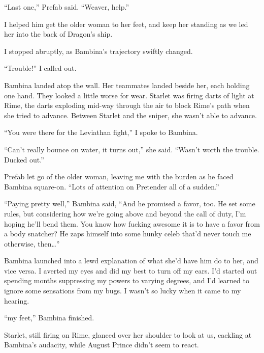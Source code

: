 ``Last one,'' Prefab said.  ``Weaver, help.''



I helped him get the older woman to her feet, and keep her standing as we led her into the back of Dragon's ship.



I stopped abruptly, as Bambina's trajectory swiftly changed.



``Trouble!'' I called out.



Bambina landed atop the wall.  Her teammates landed beside her, each holding one hand.  They looked a little worse for wear.  Starlet was firing darts of light at Rime, the darts exploding mid-way through the air to block Rime's path when she tried to advance.  Between Starlet and the sniper, she wasn't able to advance.



 ``You were there for the Leviathan fight,'' I spoke to Bambina.



``Can't really bounce on water, it turns out,'' she said.  ``Wasn't worth the trouble.  Ducked out.''



Prefab let go of the older woman, leaving me with the burden as he faced Bambina square-on.  ``Lots of attention on Pretender all of a sudden.''



``Paying pretty well,'' Bambina said, ``And he promised a favor, too.  He set some rules, but considering how we're going above and beyond the call of duty, I'm hoping he'll bend them.  You know how fucking awesome it is to have a favor from a body snatcher?  He zaps himself into some hunky celeb that'd never touch me otherwise, then\ldots''



Bambina launched into a lewd explanation of what she'd have him do to her, and vice versa.  I averted my eyes and did my best to turn off my ears.  I'd started out spending months suppressing my powers to varying degrees, and I'd learned to ignore some sensations from my bugs.  I wasn't so lucky when it came to my hearing.



``\ldotswith my feet,'' Bambina finished.



Starlet, still firing on Rime, glanced over her shoulder to look at us, cackling at Bambina's audacity, while August Prince didn't seem to react.



